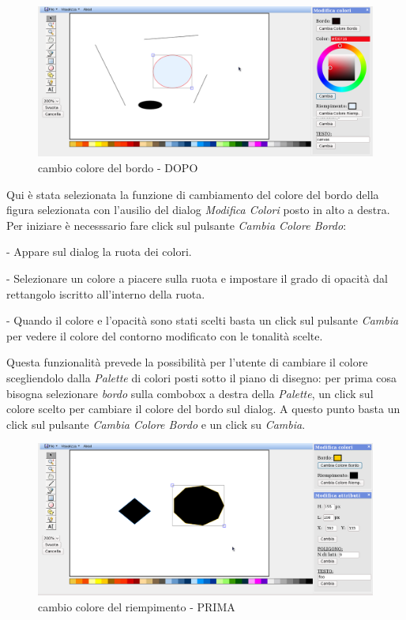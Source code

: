 \begin{figure}[!ht]
\centering
\includegraphics[scale=4]{images/colore_bordo_dopo.png}
\caption{cambio colore del bordo  - DOPO}
\end{figure} 


\vspace{100pt}
Qui \`e stata selezionata la funzione di cambiamento del colore del bordo della figura selezionata con l'ausilio del dialog \textit{Modifica Colori} posto in alto a destra. Per iniziare \`e necesssario fare click sul pulsante \textit{Cambia Colore Bordo}: 
\begin{elencopuntato}[\normindent]
\item[-] Appare sul dialog la ruota dei colori.
\item[-] Selezionare un colore a piacere sulla ruota e impostare il grado di opacit\`a dal rettangolo iscritto all'interno della ruota. 
\item[-]Quando il colore e l'opacit\`a sono stati scelti basta un click sul pulsante \textit{Cambia} per vedere il colore del contorno modificato con le tonalit\`a scelte. 
\end{elencopuntato}
Questa funzionalit\`a prevede la possibilit\`a per l'utente di cambiare il colore scegliendolo dalla \textit{Palette} di colori posti sotto il piano di disegno: per prima cosa bisogna selezionare \textit{bordo} sulla combobox a destra della \textit{Palette}, un click sul colore scelto per cambiare il colore del bordo sul dialog. A questo punto basta un click sul pulsante \textit{Cambia Colore Bordo} e un click su \textit{Cambia}.

\begin{figure}[!ht]
\centering
\includegraphics[scale=4]{images/colore_riempimento_prima.png}
\caption{cambio colore del riempimento  - PRIMA}
\end{figure} 

